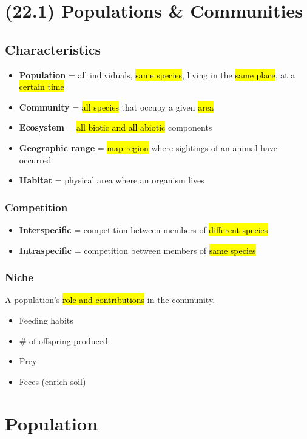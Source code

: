 \documentclass[a4paper,12pt]{article}
\begin{document}
\pagebreak

\section{(22.1) Populations \& Communities}

\subsection{Characteristics}
\begin{itemize}
    \item{\textbf{Population} = all individuals, \hl{same species}, living in the \hl{same place}, at a \hl{certain time}}
    \item{\textbf{Community} = \hl{all species} that occupy a given \hl{area}}
    \item{\textbf{Ecosystem} = \hl{all biotic and all abiotic} components}
    \item{\textbf{Geographic range} = \hl{map region} where sightings of an animal have occurred}
    \item{\textbf{Habitat} = physical area where an organism lives}
\end{itemize}

\subsubsection{Competition}
\begin{itemize}
    \item{\textbf{Interspecific} = competition between members of \hl{different species}}
    \item{\textbf{Intraspecific} = competition between members of \hl{same species}}
\end{itemize}

\subsubsection{Niche}
A population's \hl{role and contributions} in the community.
\begin{itemize}
    \item{Feeding habits}
    \item{\# of offspring produced}
    \item{Prey}
    \item{Feces (enrich soil)}
\end{itemize}

\pagebreak

\section{Population}
\end{document}
